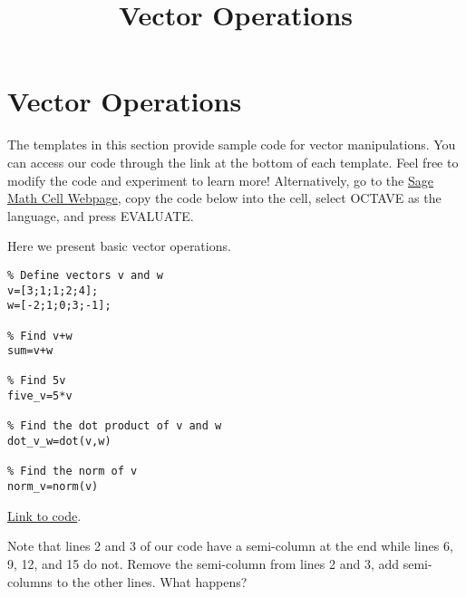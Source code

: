\documentclass{ximera}
\title{Vector Operations} \license{CC BY-NC-SA 4.0}
\begin{document}
\begin{abstract}
\end{abstract}
\maketitle
\section*{Vector Operations}

The templates in this section provide sample code for vector manipulations.  You can access our code through the link at the bottom of each template.  Feel free to modify the code and experiment to learn more!  Alternatively, go to the \href{https://sagecell.sagemath.org/}{Sage Math Cell Webpage}, copy the code below into the cell, select OCTAVE as the language, and press EVALUATE.  

\begin{template}\label{temp:vectorOps}
Here we present basic vector operations.
\begin{verbatim}
% Define vectors v and w
v=[3;1;1;2;4];
w=[-2;1;0;3;-1];

% Find v+w  
sum=v+w

% Find 5v
five_v=5*v

% Find the dot product of v and w
dot_v_w=dot(v,w)

% Find the norm of v
norm_v=norm(v)
\end{verbatim}

\href{https://sagecell.sagemath.org/?z=eJxdTUsKwyAQ3QveYTaBpG2gSZqVuCu9RChSolIX0WDMeP2O3TSUWbw37zNTwd1Y5w2gmVOIGyC8vIbMGcppEB1NL25PwVmWU9vTehWDaLuicFbBw1EazxmAs21fJNGDMSJn1qFRKMcTHoz0NqBDgjUGvc8Jgv09Jl2hypKwxktu_mo-xOWb56xQOl2gxuYDFmw51w==&lang=octave&interacts=eJyLjgUAARUAuQ==}{Link to code}.

\begin{remark}
    Note that lines 2 and 3 of our code have a semi-column at the end while lines 6, 9, 12, and 15 do not.  Remove the semi-column from lines 2 and 3, add semi-columns to the other lines.  What happens?
\end{remark}
\end{template}
\end{document}
